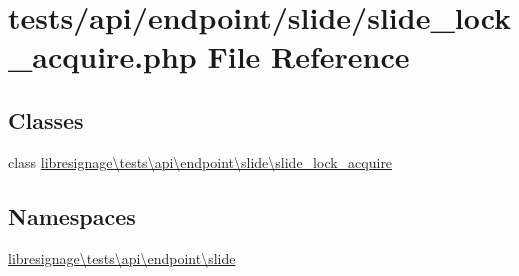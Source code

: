 \hypertarget{tests_2api_2endpoint_2slide_2slide__lock__acquire_8php}{}\section{tests/api/endpoint/slide/slide\+\_\+lock\+\_\+acquire.php File Reference}
\label{tests_2api_2endpoint_2slide_2slide__lock__acquire_8php}
\subsection*{Classes}
\begin{DoxyCompactItemize}
\item 
class \hyperlink{classlibresignage_1_1tests_1_1api_1_1endpoint_1_1slide_1_1slide__lock__acquire}{libresignage\textbackslash{}tests\textbackslash{}api\textbackslash{}endpoint\textbackslash{}slide\textbackslash{}slide\+\_\+lock\+\_\+acquire}
\end{DoxyCompactItemize}
\subsection*{Namespaces}
\begin{DoxyCompactItemize}
\item 
 \hyperlink{namespacelibresignage_1_1tests_1_1api_1_1endpoint_1_1slide}{libresignage\textbackslash{}tests\textbackslash{}api\textbackslash{}endpoint\textbackslash{}slide}
\end{DoxyCompactItemize}
